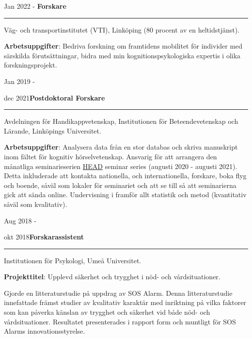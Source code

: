 \documentclass[]{article}
\begin{document}
Jan 2022 - \hspace{0.50cm}\textbf{Forskare}\vspace{1mm}

\hrule
\begin{changemargin}{2.3cm}{2.4cm}

Väg- och transportinstitutet (VTI), Linköping (80 procent av en heltidstjänst).

\textbf{Arbetsuppgifter}: Bedriva forskning om framtidens mobilitet för individer med särskilda förutsättningar, bidra med min kognitionspsykologiska expertis i olika forskningsprojekt.

\end{changemargin}

Jan 2019 -

dec 2021\hspace{0.75cm}\textbf{Postdoktoral Forskare}\vspace{1mm}

\hrule
\begin{changemargin}{2.3cm}{2.4cm}

Avdelningen för Handikappvetenskap, Institutionen för Beteendevetenskap och Lärande, Linköpings Universitet.

\textbf{Arbetsuppgifter}: Analysera data från en stor databas och skriva manuskript inom fältet för kognitiv hörselvetenskap. Ansvarig för att arrangera den månatliga seminarieserien \href{https://liu.se/linnecentrum-head/en}{HEAD} seminar series (augusti 2020 - augusti 2021). Detta inkluderade att kontakta nationella, och internationella, forskare, boka flyg och boende, såväl som lokaler för seminariet och att se till så att seminarierna gick att sända online. Undervisning i framför allt statistik och metod (kvantitativ såväl som kvalitativ).

\end{changemargin}

Aug 2018 -

okt 2018\hspace{0.75cm}\textbf{Forskarassistent}\vspace{1mm}

\hrule
\begin{changemargin}{2.3cm}{2.4cm}

Institutionen för Psykologi, Umeå Universitet.

\textbf{Projekttitel}: Upplevd säkerhet och trygghet i nöd- och vårdsituationer.

Gjorde en litteraturstudie på uppdrag av SOS Alarm. Denna litteraturstudie innefattade främst studier av kvalitativ karaktär med inriktning på vilka faktorer som kan påverka känslan av trygghet och säkerhet vid både nöd- och vårdsituationer. Resultatet presenterades i rapport form och muntligt för SOS Alarms innovationsstyrelse.

\end{changemargin}
\end{document}
